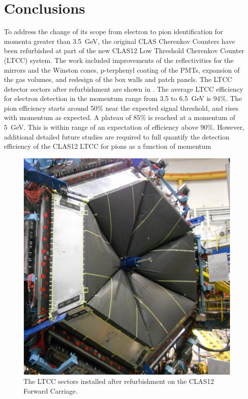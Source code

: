 \section{Conclusions}

To address the change of its scope from electron to pion identification for momenta greater than 3.5~GeV,
the original CLAS Cherenkov Counters have been refurbished at part of the new CLAS12 Low Threshold
Cherenkov Counter (LTCC) system. The work included improvements of the reflectivities for the mirrors and
the Winston cones, p-terphenyl coating of the PMTs, expansion of the gas volumes, and redesign of the box
walls and patch panels. The LTCC detector sectors after refurbishment are shown in .
The average LTCC efficiency for electron detection in the momentum range from 3.5 to 6.5~GeV is 94$\%$.
The pion efficiency starts around 50$\%$ near the expected signal threshold, and rises with momentum as
expected. A plateau of 85$\%$ is reached at a momentum of 5~GeV. This is within range of an expectation of
efficiency above 90$\%$. However, additional detailed future studies are required to full quantify the
detection efficiency of the CLAS12 LTCC for pions as a function of momentum


\begin{figure}
    \centering
    \includegraphics[width=1.0\columnwidth,keepaspectratio]{img/ltccInstalled.png}
    \caption{The LTCC sectors installed after refurbishment on the CLAS12 Forward Carriage.}
    \label{fig:ltccInstalled}
\end{figure}

